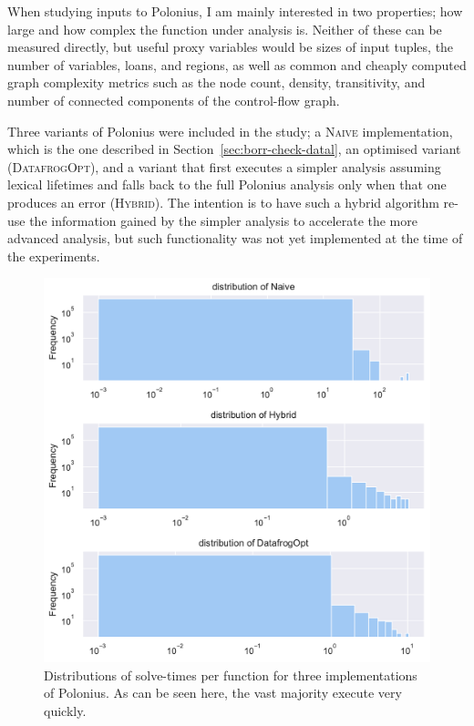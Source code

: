 \documentclass[11pt,a4paper,twoside,openany]{report}
\begin{document}
When studying inputs to Polonius, I am mainly interested in two properties; how
large and how complex the function under analysis is. Neither of these can be
measured directly, but useful proxy variables would be sizes of input tuples,
the number of variables, loans, and regions, as well as common and cheaply
computed graph complexity metrics such as the node count, density, transitivity,
and number of connected components of the control-flow graph.

Three variants of Polonius were included in the study; a \textsc{Naive}
implementation, which is the one described in
Section~\ref{sec:borr-check-datal}, an optimised variant (\textsc{DatafrogOpt}),
and a variant that first executes a simpler analysis assuming lexical lifetimes
and falls back to the full Polonius analysis only when that one produces an
error (\textsc{Hybrid}). The intention is to have such a hybrid algorithm re-use
the information gained by the simpler analysis to accelerate the more advanced
analysis, but such functionality was not yet implemented at the time of the
experiments.

\begin{figure}
  \includegraphics[width=0.9\linewidth]{Graphs/solvetimes_dist.pdf}
  \caption{Distributions of solve-times per function for three implementations
    of Polonius. As can be seen here, the vast majority execute very quickly.}
  \label{fig:solvetimes}
\end{figure}
\end{document}
